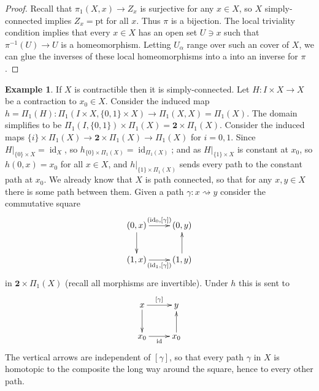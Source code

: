 \documentclass{tufte-handout}
\def\pt {\mathrm{pt}}
\DeclareMathOperator{\id}{id}
\theoremstyle{definition}
\newtheorem{example}{Example}
\begin{document}
\begin{proof}
Recall that $\pi_1(X,x) \to Z_x$ is surjective for any $x\in X$, so $X$ simply-connected implies
$Z_x = \pt$ for all $x$. Thus $\pi$ is a bijection. The local triviality condition implies 
that every $x\in X$ has an open set $U\ni x$ such that $\pi^{-1}(U) \to U$ is a homeomorphism. 
Letting $U_\alpha$ range over such an cover of $X$, we can glue the inverses of these local 
homeomorphisms into a into an inverse for $\pi$.
\end{proof}



\begin{example}
If $X$ is contractible then it is simply-connected. Let $H\colon I\times X \to X$ be a 
contraction to $x_0\in X$. Consider the induced map $h= \Pi_1(H)\colon \Pi_1(I\times X, 
\{0,1\}\times X) \to \Pi_1(X,X) = \Pi_1(X)$. The domain simplifies to be 
$\Pi_1(I,\{0,1\})\times \Pi_1(X) = \mathbf{2}\times \Pi_1(X)$. Consider the induced maps 
$\{i\}\times \Pi_1(X)\to \mathbf{2}\times \Pi_1(X) \to \Pi_1(X)$ for $i=0,1$. Since 
$H\big|_{\{0\}\times X}=\id_X$, so $h_{\{0\}\times \Pi_1(X)}=\id_{\Pi_1(X)}$; and as 
$H\big|_{\{1\}\times X}$ is constant at $x_0$, so $h(0,x) = x_0$ for all $x\in X$, and 
$h\big|_{\{1\}\times \Pi_1(X)}$ sends every path to the constant path at $x_0$. We 
already know that $X$ is path connected, so that for any $x,y\in X$ there is some path 
between them. Given a path $\gamma\colon x\rightsquigarrow y$ consider the commutative square
\[
	\xymatrix{
	(0,x) \ar[r]^{(\id_0,[\gamma])} \ar[d] & (0,y) \\
	(1,x) \ar[r]_{(\id_1,[\gamma])} & (1,y) \ar[u]
	}
\]
in $\mathbf{2}\times \Pi_1(X)$ (recall all morphisms are invertible). Under $h$ this is sent to
\[
	\xymatrix{
	x\ar[r]^{[\gamma]} \ar[d] & y \\
	x_0 \ar[r]_{\id} & x_0 \ar[u]
	}
\]
The vertical arrows are independent of $[\gamma]$, so that every path $\gamma$ in $X$ is 
homotopic to the composite the long way around the square, hence to every other path.
\end{example}
\end{document}
